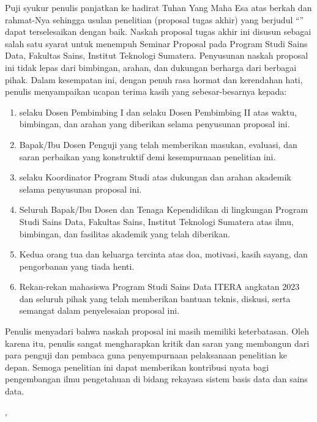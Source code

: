 \begingroup
{}
\setlength{\parskip}{5pt}
\setlength{\emergencystretch}{2em}

Puji syukur penulis panjatkan ke hadirat Tuhan Yang Maha Esa atas berkah dan rahmat-Nya sehingga usulan penelitian (proposal tugas akhir) yang berjudul “\judulIndonesia” dapat terselesaikan dengan baik. Naskah proposal tugas akhir ini disusun sebagai salah satu syarat untuk menempuh Seminar Proposal pada Program Studi Sains Data, Fakultas Sains, Institut Teknologi Sumatera. Penyusunan naskah proposal ini tidak lepas dari bimbingan, arahan, dan dukungan berharga dari berbagai pihak. Dalam kesempatan ini, dengan penuh rasa hormat dan kerendahan hati, penulis menyampaikan ucapan terima kasih yang sebesar-besarnya kepada:

\begin{enumerate}
  \setlength{\itemsep}{3pt}
  \setlength{\parsep}{0pt}
  \item \pembimbingSatu{} selaku Dosen Pembimbing I dan \pembimbingDua{} selaku Dosen Pembimbing II atas waktu, bimbingan, dan arahan yang diberikan selama penyusunan proposal ini.
  \item Bapak/Ibu Dosen Penguji yang telah memberikan masukan, evaluasi, dan saran perbaikan yang konstruktif demi kesempurnaan penelitian ini.
  \item \koordinatorProdi{} selaku Koordinator Program Studi \namaProgramStudi{} atas dukungan dan arahan akademik selama penyusunan proposal ini.
  \item Seluruh Bapak/Ibu Dosen dan Tenaga Kependidikan di lingkungan Program Studi Sains Data, Fakultas Sains, Institut Teknologi Sumatera atas ilmu, bimbingan, dan fasilitas akademik yang telah diberikan.
  \item Kedua orang tua dan keluarga tercinta atas doa, motivasi, kasih sayang, dan pengorbanan yang tiada henti.
  \item Rekan-rekan mahasiswa Program Studi Sains Data ITERA angkatan 2023 dan seluruh pihak yang telah memberikan bantuan teknis, diskusi, serta semangat dalam penyelesaian proposal ini.
\end{enumerate}

Penulis menyadari bahwa naskah proposal ini masih memiliki keterbatasan. Oleh karena itu, penulis sangat mengharapkan kritik dan saran yang membangun dari para penguji dan pembaca guna penyempurnaan pelaksanaan penelitian ke depan. Semoga penelitian ini dapat memberikan kontribusi nyata bagi pengembangan ilmu pengetahuan di bidang rekayasa sistem basis data dan sains data.

\par\noindent
\begin{minipage}[t]{\linewidth}
  \raggedleft
  \namaLokasi, \tanggalDokumen\par
  \vspace{0.9cm}
  \namaPenulis\par
\end{minipage}\par
\clearpage
\endgroup

